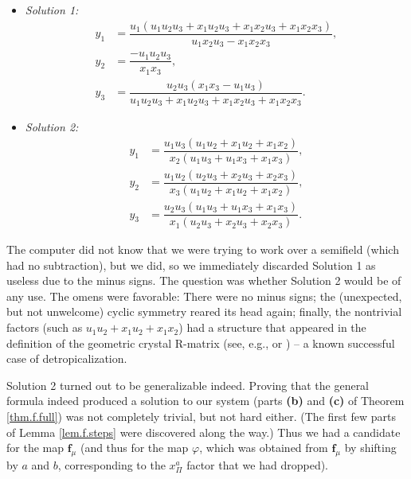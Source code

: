 \documentclass[numbers=enddot,12pt,final,onecolumn,notitlepage]{scrartcl}%
\theoremstyle{definition}
\begin{document}
\begin{itemize}
\item \textit{Solution 1:}%
\begin{align*}
y_{1}  &  =\dfrac{u_{1}\left(  u_{1}u_{2}u_{3}+x_{1}u_{2}u_{3}+x_{1}x_{2}%
u_{3}+x_{1}x_{2}x_{3}\right)  }{u_{1}x_{2}u_{3}-x_{1}x_{2}x_{3}},\\
y_{2}  &  =\dfrac{-u_{1}u_{2}u_{3}}{x_{1}x_{3}},\\
y_{3}  &  =\dfrac{u_{2}u_{3}\left(  x_{1}x_{3}-u_{1}u_{3}\right)  }{u_{1}%
u_{2}u_{3}+x_{1}u_{2}u_{3}+x_{1}x_{2}u_{3}+x_{1}x_{2}x_{3}}.
\end{align*}


\item \textit{Solution 2:}%
\begin{align*}
y_{1}  &  =\dfrac{u_{1}u_{3}\left(  u_{1}u_{2}+x_{1}u_{2}+x_{1}x_{2}\right)
}{x_{2}\left(  u_{1}u_{3}+u_{1}x_{3}+x_{1}x_{3}\right)  },\\
y_{2}  &  =\dfrac{u_{1}u_{2}\left(  u_{2}u_{3}+x_{2}u_{3}+x_{2}x_{3}\right)
}{x_{3}\left(  u_{1}u_{2}+x_{1}u_{2}+x_{1}x_{2}\right)  },\\
y_{3}  &  =\dfrac{u_{2}u_{3}\left(  u_{1}u_{3}+u_{1}x_{3}+x_{1}x_{3}\right)
}{x_{1}\left(  u_{2}u_{3}+x_{2}u_{3}+x_{2}x_{3}\right)  }.
\end{align*}

\end{itemize}

The computer did not know that we were trying to work over a semifield (which
had no subtraction), but we did, so we immediately discarded Solution 1 as
useless due to the minus signs. The question was whether Solution 2 would be
of any use. The omens were favorable: There were no minus signs; the
(unexpected, but not unwelcome) cyclic symmetry reared its head again;
finally, the nontrivial factors (such as $u_{1}u_{2}+x_{1}u_{2}+x_{1}x_{2}$)
had a structure that appeared in the definition of the geometric crystal
R-matrix (see, e.g., \cite[(5)]{Etingo03} or \cite[(4.19)]{NoumiYamada}) -- a
known successful case of detropicalization.

Solution 2 turned out to be generalizable indeed. Proving that the general
formula indeed produced a solution to our system (parts \textbf{(b)} and
\textbf{(c)} of Theorem \ref{thm.f.full}) was not completely trivial, but not
hard either. (The first few parts of Lemma \ref{lem.f.steps} were discovered
along the way.) Thus we had a candidate for the map $\mathbf{f}_{\mu}$ (and
thus for the map $\varphi$, which was obtained from $\mathbf{f}_{\mu}$ by
shifting by $a$ and $b$, corresponding to the $x_{\Pi}^{a}$ factor that we had dropped).
\end{document}
